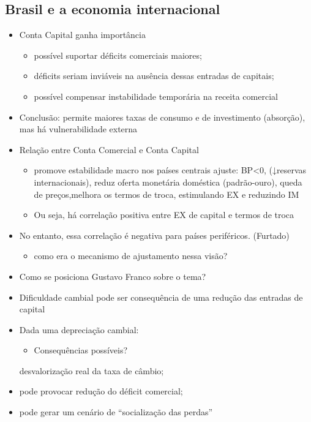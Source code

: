 \documentclass[a4paper,12pt]{article}[abntex2]
\begin{document}
\subsection{\textbf{Brasil e a economia internacional}}
\begin{itemize}
    \item Conta Capital ganha importância
    \begin{itemize}
        \item possível suportar déficits comerciais maiores;
    \end{itemize}
    \begin{itemize}
        \item déficits seriam inviáveis na ausência dessas entradas de capitais;
    \end{itemize}
    \begin{itemize}
        \item possível compensar instabilidade temporária na receita comercial
    \end{itemize}
    \item Conclusão: permite maiores taxas de consumo e de investimento (absorção), mas há vulnerabilidade externa
    \item  Relação entre Conta Comercial e Conta Capital
    \begin{itemize}
        \item promove estabilidade macro nos países centrais ajuste: BP<0, (↓reservas internacionais), reduz oferta monetária doméstica (padrão-ouro), queda de preços,melhora os termos de troca, estimulando EX e reduzindo IM
    \end{itemize}

\begin{itemize}
    \item Ou seja, há correlação positiva entre EX de capital e termos de troca
\end{itemize}
\item No entanto, essa correlação é negativa para países periféricos. (Furtado)
\begin{itemize}
    \item como era o mecanismo de ajustamento nessa visão?
\end{itemize}
\item Como se posiciona Gustavo Franco sobre o tema?
\item Dificuldade cambial pode ser consequência de uma redução das entradas de capital
\item Dada uma depreciação cambial:
\begin{itemize}
    \item Consequências possíveis?
\end{itemize}desvalorização real da taxa de câmbio;
\item pode provocar redução do déficit comercial;
\item pode gerar um cenário de “socialização das
perdas”
\end{itemize}
\end{document}
